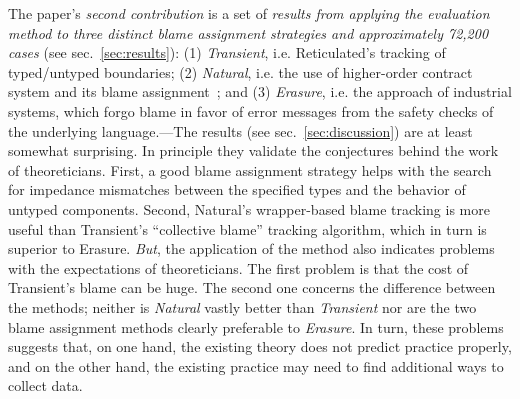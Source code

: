 The paper's {\it second contribution\/} is a set of {\em results from applying
the evaluation method to three distinct blame assignment strategies and
approximately 72,200 cases\/} (see sec.~\ref{sec:results}): (1) {\it
Transient\/}, i.e. Reticulated's tracking of typed/untyped boundaries; (2) {\it
Natural\/}, i.e. the use of higher-order contract system and its blame
assignment~\cite{ff-icfp-2002}; and (3) {\it Erasure\/}, i.e. the approach of
industrial systems, which forgo blame in favor of error messages from the safety
checks of the underlying language.---The results (see
sec.~\ref{sec:discussion}) are at least somewhat surprising.  In principle
they validate the conjectures behind the work of theoreticians.  First, a good
blame assignment strategy helps with the search for impedance mismatches between
the specified types and the behavior of untyped components.  Second, Natural's
wrapper-based blame tracking is more useful than Transient's ``collective
blame'' tracking algorithm, which in turn is superior to Erasure. {\em But\/},
the application of the method also indicates problems with the expectations of
theoreticians. The first problem is that the cost of Transient's blame can be
huge. The second one concerns the difference between the methods; neither is
{\it Natural\/} vastly better than {\it Transient\/} nor are the two blame
assignment methods clearly preferable to {\it Erasure\/}.  In turn, these
problems suggests that, on one hand, the existing theory does not predict
practice properly, and on the other hand, the existing practice may need to find
additional ways to collect data.




